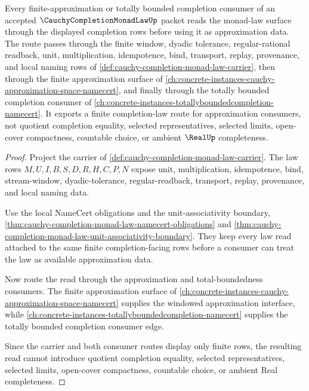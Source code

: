 \begin{theorem}
\label{thm:cauchy-completion-monad-law-finite-approximation-consumer-route}
Every finite-approximation or totally bounded completion consumer of an accepted $\CauchyCompletionMonadLawUp$ packet reads the monad-law surface through the displayed completion rows before using it as approximation data. The route passes through the finite window, dyadic tolerance, regular-rational readback, unit, multiplication, idempotence, bind, transport, replay, provenance, and local naming rows of \autoref{def:cauchy-completion-monad-law-carrier}, then through the finite approximation surface of \autoref{ch:concrete-instances-cauchy-approximation-space-namecert}, and finally through the totally bounded completion consumer of \autoref{ch:concrete-instances-totallyboundedcompletion-namecert}. It exports a finite completion-law route for approximation consumers, not quotient completion equality, selected representatives, selected limits, open-cover compactness, countable choice, or ambient $\RealUp$ completeness.
\end{theorem}
\begin{proof}
Project the carrier of \autoref{def:cauchy-completion-monad-law-carrier}. The law rows $M,U,I,B,S,D,R,H,C,P,N$ expose unit, multiplication, idempotence, bind, stream-window, dyadic-tolerance, regular-readback, transport, replay, provenance, and local naming data.

Use the local NameCert obligations and the unit-associativity boundary, \autoref{thm:cauchy-completion-monad-law-namecert-obligations} and \autoref{thm:cauchy-completion-monad-law-unit-associativity-boundary}. They keep every law read attached to the same finite completion-facing rows before a consumer can treat the law as available approximation data.

Now route the read through the approximation and total-boundedness consumers. The finite approximation surface of \autoref{ch:concrete-instances-cauchy-approximation-space-namecert} supplies the windowed approximation interface, while \autoref{ch:concrete-instances-totallyboundedcompletion-namecert} supplies the totally bounded completion consumer edge.

Since the carrier and both consumer routes display only finite rows, the resulting read cannot introduce quotient completion equality, selected representatives, selected limits, open-cover compactness, countable choice, or ambient Real completeness.
\end{proof}
